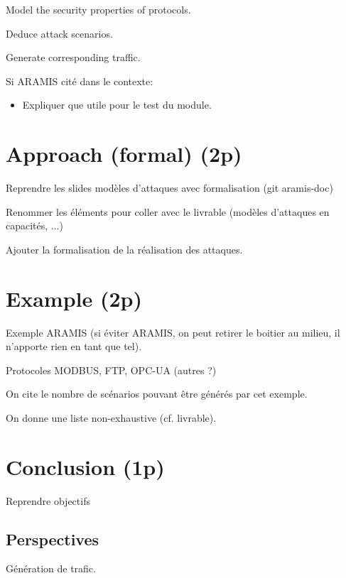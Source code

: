 \documentclass[11pt]{article}
\begin{document}
Model the security properties of protocols.

Deduce attack scenarios.

Generate corresponding traffic.

Si ARAMIS cité dans le contexte:
\begin{itemize}
    \item Expliquer que utile pour le test du module.
\end{itemize}

\section{Approach (formal) (2p)}

Reprendre les slides modèles d'attaques avec formalisation (git aramis-doc)

Renommer les éléments pour coller avec le livrable (modèles d'attaques en capacités, ...)

Ajouter la formalisation de la réalisation des attaques.

\section{Example (2p)}

Exemple ARAMIS (si éviter ARAMIS, on peut retirer le boitier au milieu,
il n'apporte rien en tant que tel).

Protocoles MODBUS, FTP, OPC-UA (autres ?)

On cite le nombre de scénarios pouvant être générés par cet exemple.

On donne une liste non-exhaustive (cf. livrable).

\section{Conclusion (1p)}

Reprendre objectifs

\subsection{Perspectives}

Génération de trafic.



\end{document}
